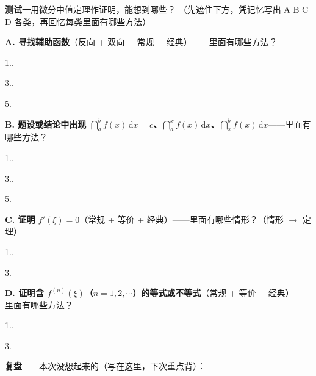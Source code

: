 \documentclass[a4paper,12pt]{article}
\newcommand{\blank}[1][3em]{\underline{\hspace{#1}}}
\begin{document}
\textbf{测试一}\quad 用微分中值定理作证明，能想到哪些？
（先遮住下方，凭记忆写出 A B C D 各类，再回忆每类里面有哪些方法）

\vspace{2.2em}

\textbf{A. 寻找辅助函数}（反向 + 双向 + 常规 + 经典）——里面有哪些方法？

\vspace{1em}
1.\blank[12em].\blank[12em]

\vspace{0.6em}
3.\blank[12em].\blank[12em]

\vspace{0.6em}
5.\blank[12em]

\vspace{2.2em}

\textbf{B. 题设或结论中出现 $\dint_{a}^{b} f(x)\,\mathrm{d}x = c$、$\dint_{a}^{x} f(x)\,\mathrm{d}x$、$\dint_{x}^{b} f(x)\,\mathrm{d}x$}——里面有哪些方法？

\vspace{1em}
1.\blank[12em].\blank[12em]

\vspace{0.6em}
3.\blank[12em].\blank[12em]

\vspace{0.6em}
5.\blank[12em]

\vspace{2.2em}

\textbf{C. 证明 $f'(\xi) = 0$}（常规 + 等价 + 经典）——里面有哪些情形？（情形 $\to$ 定理）

\vspace{1em}
1.\blank[13em].\blank[13em]

\vspace{0.6em}
3.\blank[13em]

\vspace{2.2em}

\textbf{D. 证明含 $f^{(n)}(\xi)$（$n = 1, 2, \cdots$）的等式或不等式}（常规 + 等价 + 经典）——里面有哪些方法？

\vspace{1em}
1.\blank[13em].\blank[13em]

\vspace{0.6em}
3.\blank[13em]

\vspace{2em}

\textbf{复盘}——本次没想起来的（写在这里，下次重点背）：
\end{document}
